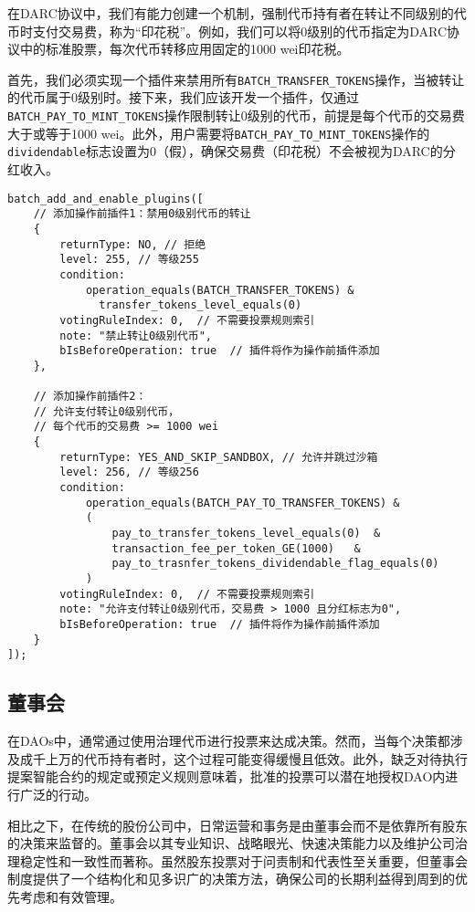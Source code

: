 \documentclass[main.tex]{subfiles}
\begin{document}
在DARC协议中，我们有能力创建一个机制，强制代币持有者在转让不同级别的代币时支付交易费，称为“印花税”。例如，我们可以将0级别的代币指定为DARC协议中的标准股票，每次代币转移应用固定的1000 wei印花税。

首先，我们必须实现一个插件来禁用所有\texttt{BATCH\_TRANSFER\_TOKENS}操作，当被转让的代币属于0级别时。接下来，我们应该开发一个插件，仅通过\texttt{BATCH\_PAY\_TO\_MINT\_TOKENS}操作限制转让0级别的代币，前提是每个代币的交易费大于或等于1000 wei。此外，用户需要将\texttt{BATCH\_PAY\_TO\_MINT\_TOKENS}操作的\texttt{dividendable}标志设置为0（假），确保交易费（印花税）不会被视为DARC的分红收入。

\begin{verbatim}
batch_add_and_enable_plugins([
    // 添加操作前插件1：禁用0级别代币的转让
    {
        returnType: NO, // 拒绝
        level: 255, // 等级255
        condition:
            operation_equals(BATCH_TRANSFER_TOKENS) & 
              transfer_tokens_level_equals(0)
        votingRuleIndex: 0,  // 不需要投票规则索引
        note: "禁止转让0级别代币",
        bIsBeforeOperation: true  // 插件将作为操作前插件添加
    },

    // 添加操作前插件2： 
    // 允许支付转让0级别代币，
    // 每个代币的交易费 >= 1000 wei
    {
        returnType: YES_AND_SKIP_SANDBOX, // 允许并跳过沙箱
        level: 256, // 等级256
        condition:
            operation_equals(BATCH_PAY_TO_TRANSFER_TOKENS) & 
            ( 
                pay_to_transfer_tokens_level_equals(0)  &
                transaction_fee_per_token_GE(1000)   &
                pay_to_trasnfer_tokens_dividendable_flag_equals(0)
            )
        votingRuleIndex: 0,  // 不需要投票规则索引
        note: "允许支付转让0级别代币，交易费 > 1000 且分红标志为0",
        bIsBeforeOperation: true  // 插件将作为操作前插件添加
    }
]);
\end{verbatim}

\subsection{董事会}

在DAOs中，通常通过使用治理代币进行投票来达成决策。然而，当每个决策都涉及成千上万的代币持有者时，这个过程可能变得缓慢且低效。此外，缺乏对待执行提案智能合约的规定或预定义规则意味着，批准的投票可以潜在地授权DAO内进行广泛的行动。

相比之下，在传统的股份公司中，日常运营和事务是由董事会而不是依靠所有股东的决策来监督的。董事会以其专业知识、战略眼光、快速决策能力以及维护公司治理稳定性和一致性而著称。虽然股东投票对于问责制和代表性至关重要，但董事会制度提供了一个结构化和见多识广的决策方法，确保公司的长期利益得到周到的优先考虑和有效管理。
\end{document}
